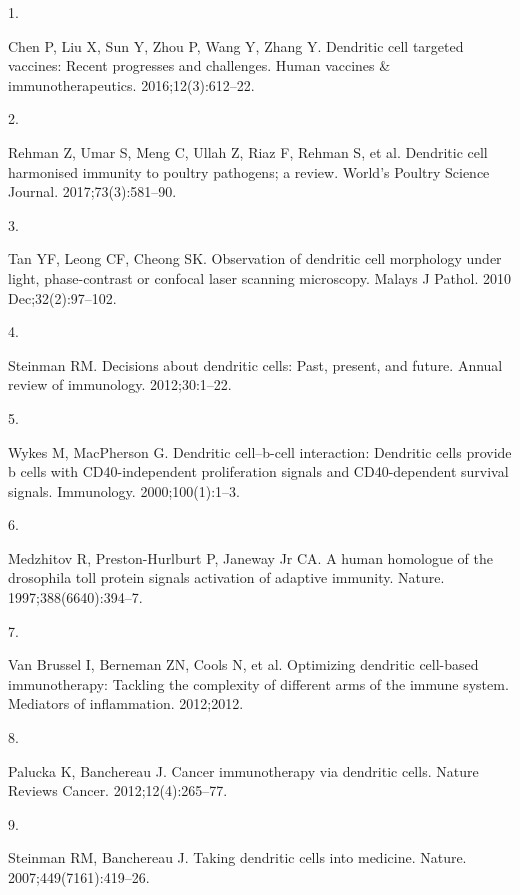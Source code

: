 \documentclass[
]{article}
\newlength{\cslhangindent}
\newlength{\csllabelwidth}
\newenvironment{CSLReferences}[2] %
 {\begin{list}{}{%
  \setlength{\itemindent}{0pt}
  \setlength{\leftmargin}{0pt}
  \setlength{\parsep}{0pt}
  \ifodd #1
   \setlength{\leftmargin}{\cslhangindent}
   \setlength{\itemindent}{-1\cslhangindent}
  \fi
  \setlength{\itemsep}{#2\baselineskip}}}
 {\end{list}}
\newcommand{\CSLLeftMargin}[1]{\parbox[t]{\csllabelwidth}{\strut#1\strut}}
\newcommand{\CSLRightInline}[1]{\parbox[t]{\linewidth - \csllabelwidth}{\strut#1\strut}}
\begin{document}
\label{refs}
\begin{CSLReferences}{0}{1}
\CSLLeftMargin{1. }%
\CSLRightInline{Chen P, Liu X, Sun Y, Zhou P, Wang Y, Zhang Y. Dendritic
cell targeted vaccines: Recent progresses and challenges. Human vaccines
\& immunotherapeutics. 2016;12(3):612--22. }

\CSLLeftMargin{2. }%
\CSLRightInline{Rehman Z, Umar S, Meng C, Ullah Z, Riaz F, Rehman S, et
al. Dendritic cell harmonised immunity to poultry pathogens; a review.
World's Poultry Science Journal. 2017;73(3):581--90. }

\CSLLeftMargin{3. }%
\CSLRightInline{Tan YF, Leong CF, Cheong SK. Observation of dendritic
cell morphology under light, phase-contrast or confocal laser scanning
microscopy. Malays J Pathol. 2010 Dec;32(2):97--102. }

\CSLLeftMargin{4. }%
\CSLRightInline{Steinman RM. Decisions about dendritic cells: Past,
present, and future. Annual review of immunology. 2012;30:1--22. }

\CSLLeftMargin{5. }%
\CSLRightInline{Wykes M, MacPherson G. Dendritic cell--b-cell
interaction: Dendritic cells provide b cells with CD40-independent
proliferation signals and CD40-dependent survival signals. Immunology.
2000;100(1):1--3. }

\CSLLeftMargin{6. }%
\CSLRightInline{Medzhitov R, Preston-Hurlburt P, Janeway Jr CA. A human
homologue of the drosophila toll protein signals activation of adaptive
immunity. Nature. 1997;388(6640):394--7. }

\CSLLeftMargin{7. }%
\CSLRightInline{Van Brussel I, Berneman ZN, Cools N, et al. Optimizing
dendritic cell-based immunotherapy: Tackling the complexity of different
arms of the immune system. Mediators of inflammation. 2012;2012. }

\CSLLeftMargin{8. }%
\CSLRightInline{Palucka K, Banchereau J. Cancer immunotherapy via
dendritic cells. Nature Reviews Cancer. 2012;12(4):265--77. }

\CSLLeftMargin{9. }%
\CSLRightInline{Steinman RM, Banchereau J. Taking dendritic cells into
medicine. Nature. 2007;449(7161):419--26. }


\end{CSLReferences}
\end{document}
